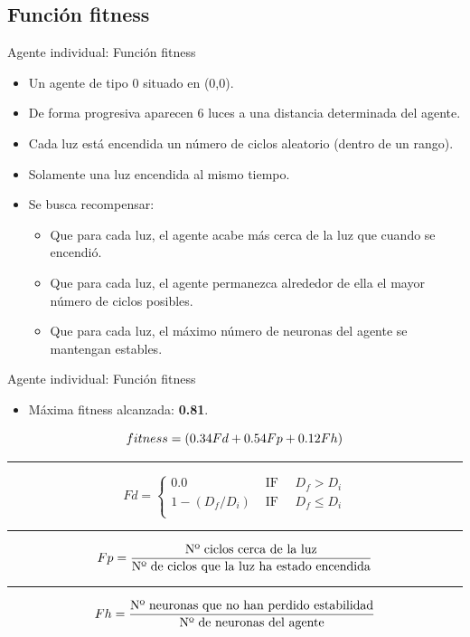 \documentclass[aspectratio=169]{beamer}
\begin{document}
\subsection{Función fitness}
\begin{frame}{Agente individual: Función fitness}
  \begin{itemize}
    \item Un agente de tipo 0 situado en (0,0).
    \item De forma progresiva aparecen 6 luces a una distancia determinada del agente.
    \item Cada luz está encendida un número de ciclos aleatorio (dentro de un rango).
    \item Solamente una luz encendida al mismo tiempo.
    \item Se busca recompensar:
    \begin{itemize}
      \item Que para cada luz, el agente acabe más cerca de la luz que cuando se encendió.
      \item Que para cada luz, el agente permanezca alrededor de ella el mayor número de ciclos posibles.
      \item Que para cada luz, el máximo número de neuronas del agente se mantengan estables.
    \end{itemize}
  \end{itemize}
\end{frame}

\begin{frame}{Agente individual: Función fitness}
\begin{itemize}
  \item Máxima fitness alcanzada: \textbf{0.81}.
\end{itemize}

\begin{equation*}
 \centering
  fitness = (0.34Fd + 0.54Fp + 0.12Fh)
\end{equation*}
\noindent\rule{14cm}{0.4pt}
\begin{equation*}
  Fd=\begin{cases}
0.0 & \text{ IF }\quad D_{f} > D_{i}  \\
1 - (D_{f} / D_{i}) & \text{ IF }\quad D_{f} \leq D_{i} \\
\end{cases}
\end{equation*}
\noindent\rule{14cm}{0.4pt}
\begin{equation*}
\centering
Fp = \frac{\text{Nº ciclos cerca de la luz}}{\text{Nº de ciclos que la luz ha estado encendida}}
\end{equation*}
\noindent\rule{14cm}{0.4pt}

\begin{equation*}
\centering
Fh = \frac{\text{Nº neuronas que no han perdido estabilidad}}{\text{Nº de neuronas del agente}}
\end{equation*}
\end{frame}
\end{document}
